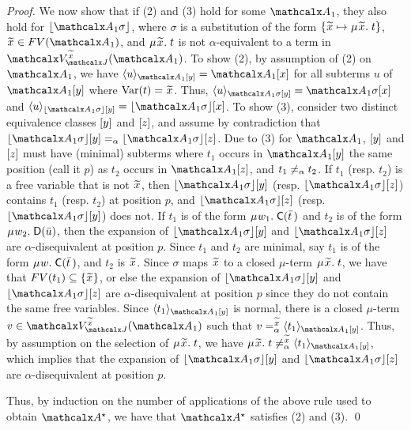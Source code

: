 \begin{rep}
\begin{proof}
We now show that if (2) and (3) hold for some $\Val_1$,
they also hold for $\nf{\Val_1 \sigma}$,
where $\sigma$ is a substitution of the form $\{ {\Varec{x}} \mapsto \MU{\Varec{x}}.\; t \}$,
${\Varec{x}} \in FV( \Val_1 )$,
and $\MU {\Varec{x}}.\; t$ is not $\alpha$-equivalent to a term in $\BAD_{\smash{\J}}^{\Varec{x}}(\Val_1)$.
To show (2),
by assumption of (2) on $\Val_1$, we have $\expand{\Val_1 \ec{y}}{ u } = \Val_1 \ec{x}$ for
all subterms $u$ of $\Val_1 \ec{y}$ where $\muvar(t) = {\Varec{x}}$.
Thus, $\expand{\Val_1 \sigma \ec{y}}{ u } = \Val_1 \sigma \ec{x}$ and
$\expand{\nf{\Val_1 \sigma} \ec{y}}{ u } = \nf{\Val_1 \sigma} \ec{x}$.
To show (3),
consider two distinct equivalence classes $[y]$ and $[z]$,
and assume by contradiction that $\nf{\Val_1 \sigma} \ec{y} \aequiv \nf{\Val_1 \sigma} \ec{z}$.
Due to (3) for $\Val_1$,
$[y]$ and $[z]$ must have (minimal) subterms
where $t_1$ occurs in $\Val_1 \ec{y}$ the same position (call it $p$) as $t_2$ occurs in $\Val_1 \ec{z}$,
and $t_1 \not\mathrel{=_\alpha} t_2$.
If $t_1$ (resp. $t_2$) is a free variable that is not ${\Varec{x}}$,
then $\nf{\Val_1 \sigma} \ec{y}$ (resp. $\nf{\Val_1 \sigma} \ec{z}$)
contains $t_1$ (resp. $t_2$) at position $p$,
and $\nf{\Val_1 \sigma} \ec{z}$ (resp. $\nf{\Val_1 \sigma} \ec{y}$) does not.
If $t_1$ is of the form $\MU w_1.\; \const{C}( \vec t \,)$
and $t_2$ is of the form $\MU w_2.\; \const{D}( \vec u )$,
then the expansion %
of $\nf{\Val_1 \sigma} \ec{y}$ and $\nf{\Val_1 \sigma} \ec{z}$
are $\alpha$-disequivalent at position $p$.
Since $t_1$ and $t_2$ are minimal,
say $t_1$ is of the form $\MU w.\; \const{C}( \vec t \,)$,
and $t_2$ is ${\Varec{x}}$.
Since $\sigma$ maps ${\Varec{x}}$ to a closed $\mu$-term $\MU {\Varec{x}}.\; t$,
we have that $FV( t_1 ) \subseteq \{ {\Varec{x}} \}$,
or else the expansion of $\nf{\Val_1 \sigma} \ec{y}$ and $\nf{\Val_1 \sigma} \ec{z}$
are $\alpha$-disequivalent at position $p$ since they do not contain the same free variables.
Since $\expand{\Val_1 \ec{y}}{t_1}$ is normal,
there is a closed $\mu$-term $v \in \BAD_{\smash{\J}}^{\Varec{x}}( \Val_1 )$
such that $v \vsimv{\Varec{x}} \expand{\Val_1 \ec{y}}{t_1}$.
Thus, by assumption on the selection of $\MU {\Varec{x}}.\; t$,
we have $\MU {\Varec{x}}.\; t \not\vsimv{\Varec{x}} \expand{\Val_1 \ec{y}}{t_1}$,
which implies that the expansion of $\nf{\Val_1 \sigma} \ec{y}$ and $\nf{\Val_1 \sigma} \ec{z}$
are $\alpha$-disequivalent at position $p$. %

Thus, by induction on the number of applications of the above rule used to obtain $\ValC$,
we have that $\ValC$ satisfies (2) and (3).
\qed
\end{proof}
\end{rep}


